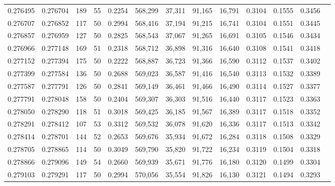 \begin{tabular}{rrrrrrrrrrrrr}
0.276495 & 0.276704 &   189 &  55 &                                     0.2254 & 568,299 &  37,311 &  91,165 &  16,791 & 0.3104 & 0.1555 & 0.3456 \\
0.276707 & 0.276852 &   117 &  50 &                                     0.2994 & 568,416 &  37,194 &  91,215 &  16,741 & 0.3104 & 0.1551 & 0.3445 \\
0.276857 & 0.276959 &   127 &  50 &                                     0.2825 & 568,543 &  37,067 &  91,265 &  16,691 & 0.3105 & 0.1546 & 0.3434 \\
0.276966 & 0.277148 &   169 &  51 &                                     0.2318 & 568,712 &  36,898 &  91,316 &  16,640 & 0.3108 & 0.1541 & 0.3418 \\
0.277152 & 0.277394 &   175 &  50 &                                     0.2222 & 568,887 &  36,723 &  91,366 &  16,590 & 0.3112 & 0.1537 & 0.3402 \\
0.277399 & 0.277584 &   136 &  50 &                                     0.2688 & 569,023 &  36,587 &  91,416 &  16,540 & 0.3113 & 0.1532 & 0.3389 \\
0.277587 & 0.277791 &   126 &  50 &                                     0.2841 & 569,149 &  36,461 &  91,466 &  16,490 & 0.3114 & 0.1527 & 0.3377 \\
0.277791 & 0.278048 &   158 &  50 &                                     0.2404 & 569,307 &  36,303 &  91,516 &  16,440 & 0.3117 & 0.1523 & 0.3363 \\
0.278050 & 0.278290 &   118 &  51 &                                     0.3018 & 569,425 &  36,185 &  91,567 &  16,389 & 0.3117 & 0.1518 & 0.3352 \\
0.278291 & 0.278412 &   107 &  53 &                                     0.3312 & 569,532 &  36,078 &  91,620 &  16,336 & 0.3117 & 0.1513 & 0.3342 \\
0.278414 & 0.278701 &   144 &  52 &                                     0.2653 & 569,676 &  35,934 &  91,672 &  16,284 & 0.3118 & 0.1508 & 0.3329 \\
0.278705 & 0.278865 &   114 &  50 &                                     0.3049 & 569,790 &  35,820 &  91,722 &  16,234 & 0.3119 & 0.1504 & 0.3318 \\
0.278866 & 0.279096 &   149 &  54 &                                     0.2660 & 569,939 &  35,671 &  91,776 &  16,180 & 0.3120 & 0.1499 & 0.3304 \\
0.279103 & 0.279291 &   117 &  50 &                                     0.2994 & 570,056 &  35,554 &  91,826 &  16,130 & 0.3121 & 0.1494 & 0.3293 \\

\end{tabular}
